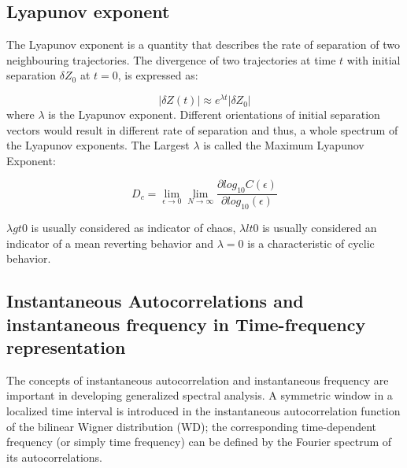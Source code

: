 \subsection{Lyapunov exponent}
The Lyapunov exponent is a quantity that describes the rate of separation of two neighbouring trajectories. The divergence of two trajectories at time $t$ with initial separation $\delta Z_0$ at $t=0$, is expressed as:

\begin{equation} \label{le:1}
|\delta Z(t)| \approx e^{\lambda t}|\delta Z_0|
\end{equation}
where $\lambda$ is the Lyapunov exponent. Different orientations of initial separation vectors would result in different rate of separation and thus, a whole spectrum of the Lyapunov exponents. The Largest $\lambda$ is called the Maximum Lyapunov Exponent: 

\begin{equation} \label{le:2}
D_c = \lim_{\epsilon\to 0} \lim_{N\to\infty} \frac{\partial log_{10} C(\epsilon)}{\partial log_{10}(\epsilon)}
\end{equation}


$\lambda gt 0$ is usually considered as indicator of chaos, $\lambda lt 0$ is usually considered an indicator of a mean reverting behavior and $\lambda = 0$ is a characteristic of cyclic behavior. 

\subsection{Instantaneous Autocorrelations and instantaneous frequency in Time-frequency representation}

The concepts of instantaneous autocorrelation and instantaneous frequency are important in developing generalized spectral analysis. A symmetric window in a localized time interval is introduced in the instantaneous autocorrelation function of the bilinear Wigner distribution (WD); the corresponding time-dependent frequency (or simply time frequency) can be defined by the Fourier spectrum of its autocorrelations. 

